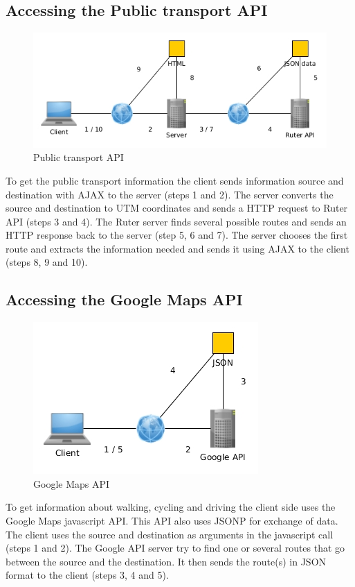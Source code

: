 \documentclass[10pt,a4paper]{article}
\begin{document}
\subsection{Accessing the Public transport API}
\begin{figure}
\centering
\includegraphics[width=\textwidth]{../ruter/access}
\caption{Public transport API}
\label{public}
\end{figure}
To get the public transport information the client sends information source and destination with AJAX to the server (steps 1 and 2). The server converts the source and destination to UTM coordinates and sends a HTTP request to Ruter API (steps 3 and 4). The Ruter server finds several possible routes and sends an HTTP response back to the server (step 5, 6 and 7). The server chooses the first route and extracts the information needed and sends it using AJAX to the client (steps 8, 9 and 10).

\subsection{Accessing the Google Maps API}
\begin{figure}
\centering
\includegraphics[width=\textwidth]{../google/access}
\caption{Google Maps API}
\label{google}
\end{figure}
To get information about walking, cycling and driving the client side uses the Google Maps javascript API. This API also uses JSONP for exchange of data. The client uses the source and destination as arguments in the javascript call (steps 1 and 2). The Google API server try to find one or several routes that go between the source and the destination. It then sends the route(s) in JSON format to the client (steps 3, 4 and 5).
\end{document}
